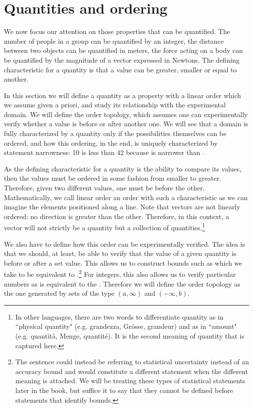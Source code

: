 \documentclass[11pt,letterpaper,fleqn]{memoir} %
\begin{document}
\section{Quantities and ordering}

We now focus our attention on those properties that can be quantified. The number of people in a group can be quantified by an integer, the distance between two objects can be quantified in meters, the force acting on a body can be quantified by the magnitude of a vector expressed in Newtons. The defining characteristic for a quantity is that a value can be greater, smaller or equal to another.

In this section we will define a quantity as a property with a linear order which we assume given a priori, and study its relationship with the experimental domain. We will define the order topology, which assumes one can experimentally verify whether a value is before or after another one. We will see that a domain is fully characterized by a quantity only if the possibilities themselves can be ordered, and how this ordering, in the end, is uniquely characterized by statement narrowness: 10 is less than 42 because  is narrower than .

As the defining characteristic for a quantity is the ability to compare its values, then the values must be ordered in some fashion from smaller to greater. Therefore, given two different values, one must be before the other. Mathematically, we call linear order an order with such a characteristic as we can imagine the elements positioned along a line. Note that vectors are not linearly ordered: no direction is greater than the other. Therefore, in this context, a vector will not strictly be a quantity but a collection of quantities.\footnote{In other languages, there are two words to differentiate quantity as in ``physical quantity" (e.g. grandezza, Gr\"osse, grandeur) and as in ``amount" (e.g. quantit\`a, Menge, quantit\'e). It is the second meaning of quantity that is captured here.}

We also have to define how this order can be experimentally verified. The idea is that we should, at least, be able to verify that the value of a given quantity is before or after a set value. This allows us to construct bounds such as  which we take to be equivalent to .\footnote{The sentence  could instead be referring to statistical uncertainty instead of an accuracy bound and would constitute a different statement when the different meaning is attached. We will be treating these types of statistical statements later in the book, but suffice it to say that they cannot be defined before statements that identify bounds.} For integers, this also allows us to verify particular numbers as  is equivalent to the . Therefore we will define the order topology as the one generated by sets of the type $(a, \infty)$ and $(-\infty, b)$.
\end{document}
